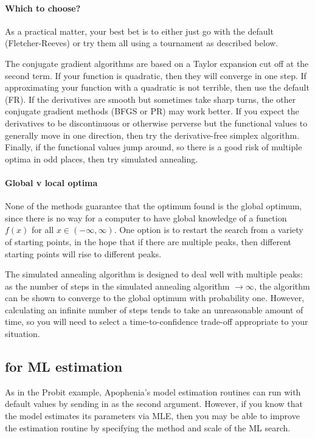 \paragraph{Which to choose?}
As a practical matter, your best bet is to either just go with the default
(Fletcher-Reeves) or try them all using a tournament as described below.

The conjugate gradient algorithms are based on a Taylor expansion cut
off at the second term. If your function is quadratic, then they will
converge in one step.  
If approximating your function with a quadratic is not terrible, then
use the default (FR). If the derivatives are smooth but sometimes take sharp
turns, the other conjugate gradient methods (BFGS or PR) may work
better. If you expect the derivatives to be discontinuous or otherwise
perverse  but the functional
values to generally move in one direction, then 
try the derivative-free simplex algorithm. Finally, if the functional
values jump around, so there is a good risk of multiple
optima in odd places, then try simulated annealing.

\paragraph{Global v local optima}
None of the methods guarantee that the optimum found is the global
optimum, since there is no way for a computer to have global knowledge
of a function $f(x)$ for all $x \in (-\infty, \infty)$. One option is
to restart the search from a variety of starting points, in the hope
that if there are multiple peaks, then different starting points will
rise to different peaks.

The simulated annealing algorithm is designed to deal well with multiple
peaks: as the number of steps in the simulated annealing algorithm $\to
\infty$, the algorithm can be shown to converge to the global optimum
with probability one. However, calculating an infinite number of steps
tends to take an unreasonable amount of time, so you will need to select
a time-to-confidence trade-off appropriate to your situation.


\subsection{ for ML estimation}
As in the Probit example, Apophenia's model estimation routines can run
with default values by sending in  as the second
argument. However, if you know that the model estimates its parameters
via MLE, then you may be able to improve the estimation routine by
specifying the method and scale of the ML search.

